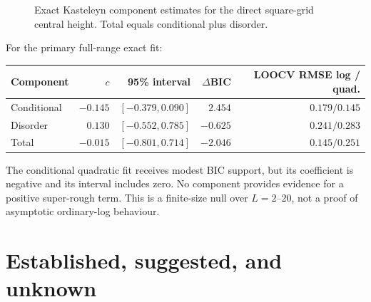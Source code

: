 \documentclass[11pt,a4paper,oneside,openany]{memoir}
\newcommand{\1}{\bm{1}}
\begin{document}
\begin{figure}[H]
\centering
{}
\caption{Exact Kasteleyn component estimates for the direct square-grid central height. Total equals conditional plus disorder.}
\label{fig:kasteleyn-components}
\end{figure}

For the primary full-range exact fit:

\begin{center}
\begin{tabular}{lrrrr}
\toprule
\textbf{Component} & $c$ & \textbf{95\% interval} & $\Delta$BIC & \textbf{LOOCV RMSE log / quad.}\\
\midrule
Conditional & $-0.145$ & $[-0.379,0.090]$ & $2.454$ & $0.179/0.145$\\
Disorder & $0.130$ & $[-0.552,0.785]$ & $-0.625$ & $0.241/0.283$\\
Total & $-0.015$ & $[-0.801,0.714]$ & $-2.046$ & $0.145/0.251$\\
\bottomrule
\end{tabular}
\end{center}

The conditional quadratic fit receives modest BIC support, but its coefficient
is negative and its interval includes zero. No component provides evidence for
a positive super-rough term. This is a finite-size null over $L=2$--20, not a
proof of asymptotic ordinary-log behaviour.

\section{Established, suggested, and unknown}
\end{document}
